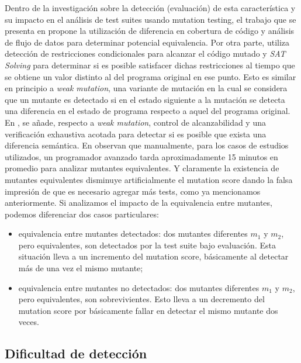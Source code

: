 Dentro de la investigaci\'on sobre la detecci\'on (evaluaci\'on) de esta caracter\'istica y su impacto en el an\'alisis de test suites usando mutation testing, el trabajo que se presenta en \cite{biblography.mutation.evaluation.equivalent.Schuler+10} propone la utilizaci\'on de diferencia en cobertura de c\'odigo y an\'alisis de flujo de datos para determinar potencial equivalencia. Por otra parte, \cite{biblography.mutation.evaluation.equivalent.Just+13} utiliza detecci\'on de restricciones condicionales para alcanzar el c\'odigo mutado y \emph{SAT Solving} para determinar si es posible satisfacer dichas restricciones al tiempo que se obtiene un valor distinto al del programa original en ese punto. Esto es similar en principio a \emph{weak mutation}, una variante de mutaci\'on en la cual se considera que un mutante es detectado si en el estado siguiente a la mutaci\'on se detecta una diferencia en el estado de programa respecto a aquel del programa original. En \cite{biblography.mutation.evaluation.equivalent.Just+13}, se a\~nade, respecto a \emph{weak mutation}, control de alcanzabilidad y una verificaci\'on exhaustiva acotada para detectar si es posible que exista una diferencia sem\'antica.
En \cite{biblography.mutation.evaluation.equivalent.Grun+09} observan que manualmente, para los casos de estudios utilizados, un programador avanzado tarda aproximadamente 15 minutos en promedio para analizar mutantes equivalentes. Y claramente la existencia de mutantes equivalentes disminuye artificialmente el mutation score dando la falsa impresi\'on de que es necesario agregar m\'as tests, como ya mencionamos anteriormente. Si analizamos el impacto de la equivalencia entre mutantes, podemos diferenciar dos casos particulares: 
\begin{itemize}
\item equivalencia entre mutantes detectados: dos mutantes diferentes $m_1$ y $m_2$, pero equivalentes, son detectados por la test suite bajo evaluaci\'on. Esta situaci\'on lleva a un incremento del mutation score, b\'asicamente al detectar m\'as de una vez el mismo mutante; 

\item equivalencia entre mutantes no detectados: dos mutantes diferentes $m_1$ y $m_2$, pero equivalentes, son sobrevivientes. Esto lleva a un decremento del mutation score por b\'asicamente fallar en detectar el mismo mutante dos veces.
\end{itemize}



\subsection{Dificultad de detecci\'on}

